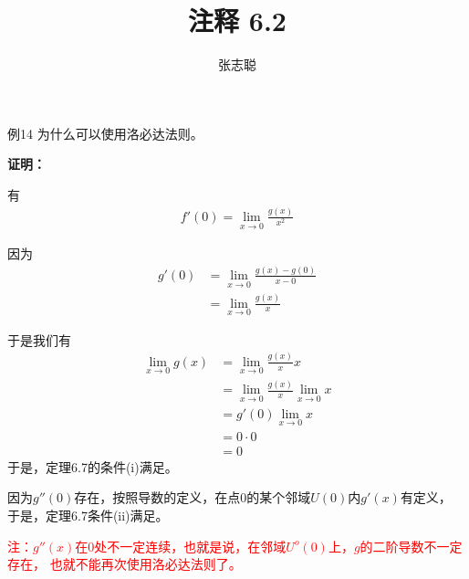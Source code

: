 \documentclass{article}
\begin{document}
\title{注释 6.2}
\author{张志聪}
\maketitle
\begin{zremark}
  例14 为什么可以使用洛必达法则。
\end{zremark}

\textbf{证明：}

有
\begin{align*}
  f'(0) = \lim\limits_{x \to 0} \frac{g(x)}{x^2}
\end{align*}

因为
\begin{align*}
  g'(0) & = \lim\limits_{x \to 0} \frac{g(x) - g(0)}{x - 0} \\
        & = \lim\limits_{x \to 0} \frac{g(x)}{x}
\end{align*}

于是我们有
\begin{align*}
  \lim \limits_{x \to 0} g(x) & = \lim\limits_{x \to 0} \frac{g(x)}{x} x                       \\
                              & = \lim\limits_{x \to 0} \frac{g(x)}{x} \lim\limits_{x \to 0} x \\
                              & = g'(0) \lim\limits_{x \to 0} x                                \\
                              & = 0 \cdot 0                                                    \\
                              & = 0
\end{align*}
于是，定理6.7的条件(i)满足。

因为$g''(0)$存在，按照导数的定义，在点$0$的某个邻域$U(0)$内$g'(x)$有定义，
于是，定理6.7条件(ii)满足。

\textcolor{red}{注：$g''(x)$在$0$处不一定连续，也就是说，在邻域$U^o(0)$上，$g$的二阶导数不一定存在，
也就不能再次使用洛必达法则了。}
\end{document}
